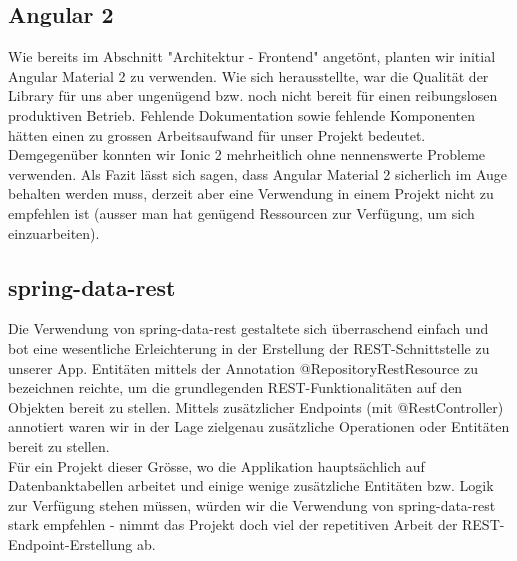 \documentclass[11pt]{article} %
\begin{document}
\subsection{Angular 2}
Wie bereits im Abschnitt "Architektur - Frontend" angetönt, planten wir initial Angular Material 2 zu verwenden. Wie sich herausstellte, war die Qualität der Library für uns aber ungenügend bzw. noch nicht bereit für einen reibungslosen produktiven Betrieb. Fehlende Dokumentation sowie fehlende Komponenten hätten einen zu grossen Arbeitsaufwand für unser Projekt bedeutet. Demgegenüber konnten wir Ionic 2 mehrheitlich ohne nennenswerte Probleme verwenden. Als Fazit lässt sich sagen, dass Angular Material 2 sicherlich im Auge behalten werden muss, derzeit aber eine Verwendung in einem Projekt nicht zu empfehlen ist (ausser man hat genügend Ressourcen zur Verfügung, um sich einzuarbeiten).

\subsection{spring-data-rest}
Die Verwendung von spring-data-rest gestaltete sich überraschend einfach und bot eine wesentliche Erleichterung in der Erstellung der REST-Schnittstelle zu unserer App. Entitäten mittels der Annotation @RepositoryRestResource zu bezeichnen reichte, um die grundlegenden REST-Funktionalitäten auf den Objekten bereit zu stellen. Mittels zusätzlicher Endpoints (mit @RestController) annotiert waren wir in der Lage zielgenau zusätzliche Operationen oder Entitäten bereit zu stellen.
\\
Für ein Projekt dieser Grösse, wo die Applikation hauptsächlich auf Datenbanktabellen arbeitet und einige wenige zusätzliche Entitäten bzw. Logik zur Verfügung stehen müssen, würden wir die Verwendung von spring-data-rest stark empfehlen - nimmt das Projekt doch viel der repetitiven Arbeit der REST-Endpoint-Erstellung ab.
\end{document}
